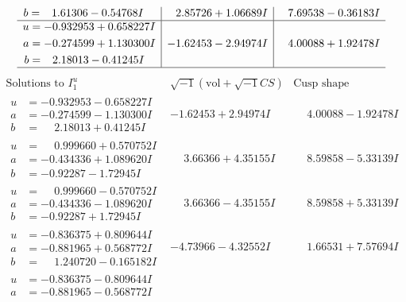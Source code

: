\documentclass[1p]{elsarticle_modified}
\theoremstyle{definition}
\newcommand{\I}{\sqrt{-1}}
\begin{document}
$$\begin{array}{c|c|c}
\begin{aligned}
b &= \phantom{-}1.61306 - 0.54768 I\end{aligned}
 & \phantom{-}2.85726 + 1.06689 I & \phantom{-}7.69538 - 0.36183 I \\ \hline\begin{aligned}
u &= -0.932953 + 0.658227 I \\
a &= -0.274599 + 1.130300 I \\
b &= \phantom{-}2.18013 - 0.41245 I\end{aligned}
 & -1.62453 - 2.94974 I & \phantom{-}4.00088 + 1.92478 I\\
 \hline 
 \end{array}$$\newpage$$\begin{array}{c|c|c}  
\text{Solutions to }I^u_{1}& \I (\text{vol} + \sqrt{-1}CS) & \text{Cusp shape}\\
 \hline 
\begin{aligned}
u &= -0.932953 - 0.658227 I \\
a &= -0.274599 - 1.130300 I \\
b &= \phantom{-}2.18013 + 0.41245 I\end{aligned}
 & -1.62453 + 2.94974 I & \phantom{-}4.00088 - 1.92478 I \\ \hline\begin{aligned}
u &= \phantom{-}0.999660 + 0.570752 I \\
a &= -0.434336 + 1.089620 I \\
b &= -0.92287 - 1.72945 I\end{aligned}
 & \phantom{-}3.66366 + 4.35155 I & \phantom{-}8.59858 - 5.33139 I \\ \hline\begin{aligned}
u &= \phantom{-}0.999660 - 0.570752 I \\
a &= -0.434336 - 1.089620 I \\
b &= -0.92287 + 1.72945 I\end{aligned}
 & \phantom{-}3.66366 - 4.35155 I & \phantom{-}8.59858 + 5.33139 I \\ \hline\begin{aligned}
u &= -0.836375 + 0.809644 I \\
a &= -0.881965 + 0.568772 I \\
b &= \phantom{-}1.240720 - 0.165182 I\end{aligned}
 & -4.73966 - 4.32552 I & \phantom{-}1.66531 + 7.57694 I \\ \hline\begin{aligned}
u &= -0.836375 - 0.809644 I \\
a &= -0.881965 - 0.568772 I \\

\end{aligned}
\end{array}$$
\end{document}
